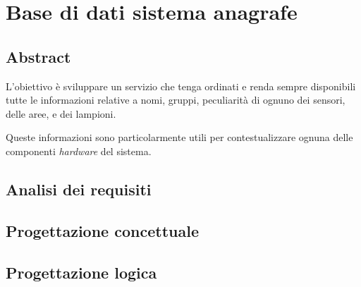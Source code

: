\chapter{Base di dati sistema anagrafe}

\section{Abstract}

L'obiettivo è sviluppare un servizio che tenga ordinati e renda sempre disponibili tutte le informazioni relative a nomi, gruppi, peculiarità di ognuno dei sensori, delle aree, e dei lampioni. 

Queste informazioni sono particolarmente utili per contestualizzare ognuna delle componenti {\it{hardware}} del sistema.

\section{Analisi dei requisiti}

\section{Progettazione concettuale}

\section{Progettazione logica}